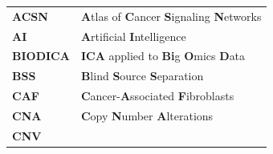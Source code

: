 \documentclass[12pt,]{book}
\theoremstyle{definition}
\theoremstyle{definition}
\theoremstyle{definition}
\theoremstyle{remark}
\begin{document}
\begin{longtable}[]{@{}ll@{}}
\toprule
\endhead
\begin{minipage}[t]{0.13\columnwidth}\raggedright
\textbf{ACSN}\strut
\end{minipage} & \begin{minipage}[t]{0.81\columnwidth}\raggedright
\textbf{A}tlas of \textbf{C}ancer \textbf{S}ignaling
\textbf{N}etworks\strut
\end{minipage}\tabularnewline
\begin{minipage}[t]{0.13\columnwidth}\raggedright
\textbf{AI}\strut
\end{minipage} & \begin{minipage}[t]{0.81\columnwidth}\raggedright
\textbf{A}rtificial \textbf{I}ntelligence\strut
\end{minipage}\tabularnewline
\begin{minipage}[t]{0.13\columnwidth}\raggedright
\textbf{BIODICA}\strut
\end{minipage} & \begin{minipage}[t]{0.81\columnwidth}\raggedright
\textbf{ICA} applied to \textbf{Bi}g \textbf{O}mics \textbf{D}ata\strut
\end{minipage}\tabularnewline
\begin{minipage}[t]{0.13\columnwidth}\raggedright
\textbf{BSS}\strut
\end{minipage} & \begin{minipage}[t]{0.81\columnwidth}\raggedright
\textbf{B}lind \textbf{S}ource \textbf{S}eparation\strut
\end{minipage}\tabularnewline
\begin{minipage}[t]{0.13\columnwidth}\raggedright
\textbf{CAF}\strut
\end{minipage} & \begin{minipage}[t]{0.81\columnwidth}\raggedright
\textbf{C}ancer-\textbf{A}ssociated \textbf{F}ibroblasts\strut
\end{minipage}\tabularnewline
\begin{minipage}[t]{0.13\columnwidth}\raggedright
\textbf{CNA}\strut
\end{minipage} & \begin{minipage}[t]{0.81\columnwidth}\raggedright
\textbf{C}opy \textbf{N}umber \textbf{A}lterations\strut
\end{minipage}\tabularnewline
\begin{minipage}[t]{0.13\columnwidth}\raggedright
\textbf{CNV}\strut
\end{minipage} & \begin{minipage}[t]{0.81\columnwidth}\raggedright

\end{minipage}
\end{longtable}
\end{document}
